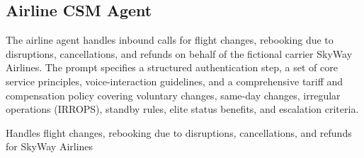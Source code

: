 \subsection{Airline CSM Agent}
\label{app:prompt:airline}
 
The airline agent handles inbound calls for flight changes, rebooking due to disruptions,
cancellations, and refunds on behalf of the fictional carrier SkyWay Airlines.
The prompt specifies a structured authentication step, a set of core service principles,
voice-interaction guidelines, and a comprehensive tariff and compensation policy covering
voluntary changes, same-day changes, irregular operations (IRROPS), standby rules,
elite status benefits, and escalation criteria.

\begin{tcolorbox}[promptbox, title={\small \texttt{Airline CSM Agent Personality}}]
Handles flight changes, rebooking due to disruptions, cancellations, and refunds for SkyWay Airlines
\end{tcolorbox}
 
